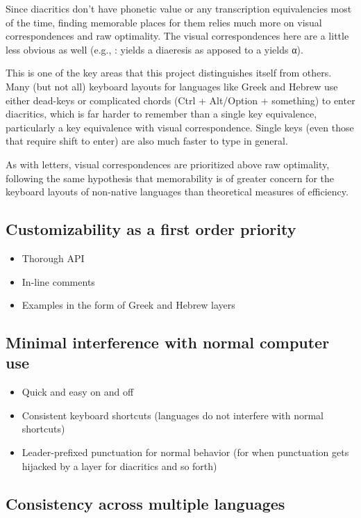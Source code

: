 \documentclass[11pt]{article}
\begin{document}
Since diacritics don't have phonetic value or any transcription equivalencies most of the time, finding memorable places for them relies much more on visual correspondences and raw optimality. The visual correspondences here are a little less obvious as well (e.g., : yields a diaeresis as apposed to a yields α).

This is one of the key areas that this project distinguishes itself from others. Many (but not all) keyboard layouts for languages like Greek and Hebrew use either dead-keys or complicated chords (Ctrl + Alt/Option + something) to enter diacritics, which is far harder to remember than a single key equivalence, particularly a key equivalence with visual correspondence. Single keys (even those that require shift to enter) are also much faster to type in general.

As with letters, visual correspondences are prioritized above raw optimality, following the same hypothesis that memorability is of greater concern for the keyboard layouts of non-native languages than theoretical measures of efficiency.

\subsection{Customizability as a first order priority}
\label{sec:orgf37a9ba}

\begin{itemize}
\item Thorough API
\item In-line comments
\item Examples in the form of Greek and Hebrew layers
\end{itemize}

\subsection{Minimal interference with normal computer use}
\label{sec:orgb27dc69}

\begin{itemize}
\item Quick and easy on and off
\item Consistent keyboard shortcuts (languages do not interfere with normal shortcuts)
\item Leader-prefixed punctuation for normal behavior (for when punctuation gets hijacked by a layer for diacritics and so forth)
\end{itemize}

\subsection{Consistency across multiple languages}
\label{sec:org9ba8e6e}
\end{document}

